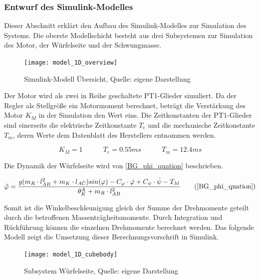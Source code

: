 \newpage
\subsubsection{Entwurf des Simulink-Modelles}
Dieser Abschnitt erklärt den Aufbau des Simulink-Modelles zur Simulation des Systems. Die oberste Modellschicht besteht aus drei Subsystemen zur Simulation des Motor, der Würfelseite und der Schwungmasse.

\begin{figure}[h]
\label{Simulink_1DModell_Overview}
\texttt{[image: model\_1D\_overview]}
\caption{Simulink-Modell Übersicht, Quelle: eigene Darstellung}
\end{figure}

Der Motor wird als zwei in Reihe geschaltete PT1-Glieder simuliert. Da der Regler als Stellgröße ein Motormoment berechnet, beträgt die Verstärkung des Motor $K_M$ in der Simulation den Wert eins. Die Zeitkonstanten der PT1-Glieder sind einerseits die elektrische Zeitkonstante $T_e$ und die mechanische Zeitkonstante $T_m$, deren Werte dem Datenblatt des Herstellers entnommen werden.

\begin{equation}
K_M = 1 \hspace{35pt} T_e = 0.55ms \hspace{35pt} T_m = 12.4ms
\end{equation}

Die Dynamik der Würfelseite wird von \ref{BG_phi_quation} beschrieben.

\begin{equation}
\ddot{\varphi} = \frac{g(m_R \cdot l_{AB}^2 + m_K \cdot l_{AC})sin(\varphi) - C_{\varphi} \cdot \dot{\varphi} + C_{\psi} \cdot \dot{\psi} - T_M}{{\theta}^A_K + m_R \cdot l_{AB}^2} \tag{\ref{BG_phi_quation}}
\end{equation}

Somit ist die Winkelbeschleunigung gleich der Summe der Drehmomente geteilt durch die betroffenen Massenträgheitsmomente. Durch Integration und Rückführung können die einzelnen Drehmomente berechnet werden. Das folgende Modell zeigt die Umsetzung dieser Berechnungsvorschrift in Simulink.

\begin{figure}[h]
\label{Simulink_1DModell_CubeBody_pic}
\texttt{[image: model\_1D\_cubebody]}
\caption{Subsystem Würfelseite, Quelle: eigene Darstellung}
\end{figure}


